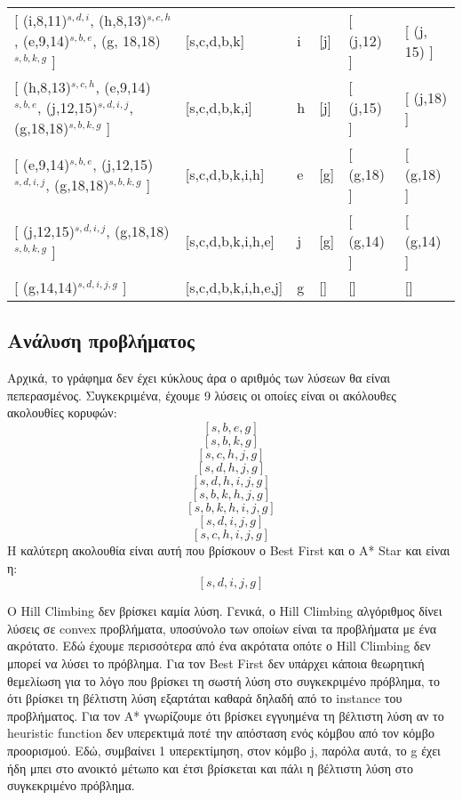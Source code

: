 \documentclass[a4paper,oneside, 11pt]{article}
\begin{document}
\begin{adjustbox}{width=\textwidth,center=\textwidth}
\begin{tabular}{llllll}
	{[} (i,8,11)$^{s,d,i}$, (h,8,13)$^{s,c,h}$, (e,9,14)$^{s,b,e}$, (g, 18,18)$^{s,b,k,g}$ {]} & {[}s,c,d,b,k{]}                 & i                                  & {[}j{]}                              & {[} (j,12) {]}              & {[} (j, 15) {]}              \\
	{[} (h,8,13)$^{s,c,h}$, (e,9,14)$^{s,b,e}$, (j,12,15)$^{s,d,i,j}$, (g,18,18)$^{s,b,k,g}$ {]} & {[}s,c,d,b,k,i{]}               & h                                  & {[}j{]}                              & {[} (j,15) {]}              & {[} (j,18) {]}               \\
	{[} (e,9,14)$^{s,b,e}$, (j,12,15)$^{s,d,i,j}$, (g,18,18)$^{s,b,k,g}$ {]}           & {[}s,c,d,b,k,i,h{]}             & e                                  & {[}g{]}                              & {[} (g,18) {]}              & {[} (g,18) {]}               \\
	{[} (j,12,15)$^{s,d,i,j}$, (g,18,18)$^{s,b,k,g}$ {]}                     & {[}s,c,d,b,k,i,h,e{]}           & j                                  & {[}g{]}                              & {[} (g,14) {]}              & {[} (g,14) {]}               \\
	{[} (g,14,14)$^{s,d,i,j,g}$ {]}                                & {[}s,c,d,b,k,i,h,e,j{]}         & g                                  & {[}{]}                               & {[}{]}                      & {[}{]}                      
\end{tabular}
\end{adjustbox}
\subsection*{Ανάλυση προβλήματος}

Αρχικά, το γράφημα δεν έχει κύκλους άρα ο αριθμός των λύσεων θα είναι πεπερασμένος. Συγκεκριμένα, έχουμε 9 λύσεις οι οποίες είναι οι ακόλουθες ακολουθίες κορυφών:
$$[s, b, e, g]$$
$$[s, b, k, g]$$
$$[s, c, h, j, g]$$
$$[s, d, h, j, g]$$
$$[s, d, h, i, j, g]$$
$$[s, b, k, h, j, g]$$
$$[s, b, k, h, i, j, g]$$
$$[s, d, i, j, g]$$
$$[s, c, h, i, j, g]$$
Η καλύτερη ακολουθία είναι αυτή που βρίσκουν ο Best First και ο A* Star και είναι η:
$$[s, d, i, j, g]$$ \bigbreak 

Ο Hill Climbing δεν βρίσκει καμία λύση. Γενικά, ο Hill Climbing αλγόριθμος δίνει λύσεις σε convex προβλήματα, υποσύνολο των οποίων είναι τα προβλήματα με ένα ακρότατο. Εδώ έχουμε περισσότερα από ένα ακρότατα οπότε ο Hill Climbing δεν μπορεί να λύσει το πρόβλημα. Για τον Best First δεν υπάρχει κάποια θεωρητική θεμελίωση για το λόγο που βρίσκει τη σωστή λύση στο συγκεκριμένο πρόβλημα, το ότι βρίσκει τη βέλτιστη λύση εξαρτάται καθαρά δηλαδή από το instance του προβλήματος. Για τον A* γνωρίζουμε ότι βρίσκει εγγυημένα τη βέλτιστη λύση αν το heuristic function δεν υπερεκτιμά ποτέ την απόσταση ενός κόμβου από τον κόμβο προορισμού. Εδώ, συμβαίνει 1 υπερεκτίμηση, στον κόμβο j, παρόλα αυτά, το g έχει ήδη μπει στο ανοικτό μέτωπο και έτσι βρίσκεται και πάλι η βέλτιστη λύση στο συγκεκριμένο πρόβλημα.
\end{document}
